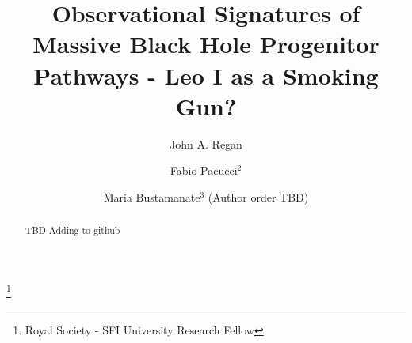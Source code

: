 \documentclass[twocolumn, tighten]{aastex631}
\begin{document}
\title[Leo I a fossil galaxy]{Observational Signatures of Massive Black Hole Progenitor Pathways - Leo I as a Smoking Gun?}

\author[0000-0001-9072-6427]{John A. Regan}
\thanks{Royal Society - SFI University Research Fellow}

\author{Fabio Pacucci$^{2}$}
\author{Maria Bustamanate$^{3}$ (Author order TBD)}





\begin{abstract}
 TBD Adding to github
\end{abstract}

\end{document}
